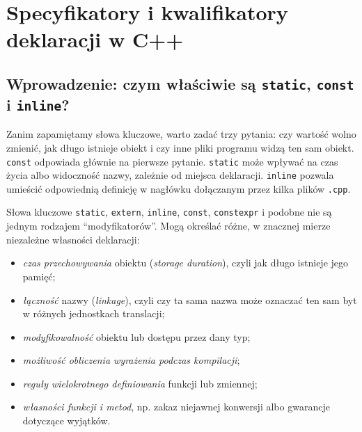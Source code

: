 
\chapter{Specyfikatory i kwalifikatory deklaracji w C++}
\label{chap:specyfikatory-cpp}

\section{Wprowadzenie: czym właściwie są \texttt{static}, \texttt{const} i \texttt{inline}?}

Zanim zapamiętamy słowa kluczowe, warto zadać trzy pytania:
czy wartość wolno zmienić, jak długo istnieje obiekt i czy inne pliki
programu widzą ten sam obiekt. \texttt{const} odpowiada głównie na
pierwsze pytanie. \texttt{static} może wpływać na czas życia albo
widoczność nazwy, zależnie od miejsca deklaracji. \texttt{inline}
pozwala umieścić odpowiednią definicję w nagłówku dołączanym przez
kilka plików \texttt{.cpp}.

Słowa kluczowe \texttt{static}, \texttt{extern}, \texttt{inline}, \texttt{const},
\texttt{constexpr} i podobne nie są jednym rodzajem ``modyfikatorów''.
Mogą określać różne, w znacznej mierze niezależne własności deklaracji:
\begin{itemize}
    \item \emph{czas przechowywania} obiektu (\emph{storage duration}), czyli
    jak długo istnieje jego pamięć;
    \item \emph{łączność} nazwy (\emph{linkage}), czyli czy ta sama nazwa
    może oznaczać ten sam byt w różnych jednostkach translacji;
    \item \emph{modyfikowalność} obiektu lub dostępu przez dany typ;
    \item \emph{możliwość obliczenia wyrażenia podczas kompilacji};
    \item \emph{reguły wielokrotnego definiowania} funkcji lub zmiennej;
    \item \emph{własności funkcji i metod}, np. zakaz niejawnej konwersji
    albo gwarancje dotyczące wyjątków.
\end{itemize}

